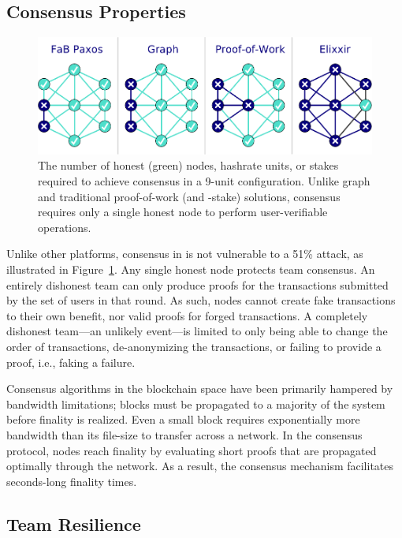 \subsection{Consensus Properties}

\begin{figure}[ht]
    \centering
    \includegraphics[width=\textwidth]{img/Consensus.pdf}
    \caption{The number of honest (green) nodes, hashrate units, or stakes required to achieve consensus in a 9-unit configuration. Unlike graph and traditional proof-of-work (and -stake) solutions, \name consensus requires only a single honest node to perform user-verifiable operations.}
    \label{figure:consensus}
\end{figure}

Unlike other platforms, consensus in \name is not vulnerable to a 51\% attack, as illustrated in Figure~\ref{figure:consensus}. Any single honest node protects team consensus. An entirely dishonest team can only produce proofs for the transactions submitted by the set of users in that round. As such, nodes cannot create fake transactions to their own benefit, nor valid proofs for forged transactions. A completely dishonest team---an unlikely event---is limited to only being able to change the order of transactions, de-anonymizing the transactions, or failing to provide a proof, i.e., faking a failure.

Consensus algorithms in the blockchain space have been primarily hampered by bandwidth limitations; blocks must be propagated to a majority of the system before finality is realized. Even a small block requires exponentially more bandwidth than its file-size to transfer across a network. In the \name consensus protocol, nodes reach finality by evaluating short proofs that are propagated optimally through the network. As a result, the \name consensus mechanism facilitates seconds-long finality times.

\subsection{Team Resilience}

